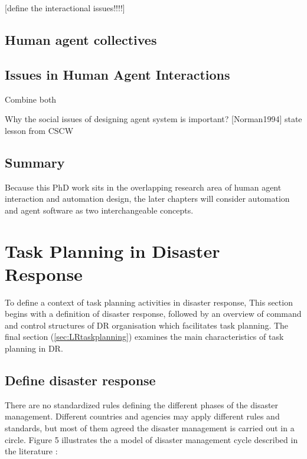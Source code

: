 [define the interactional issues!!!!]

\subsection{Human agent collectives}


\subsection{Issues in Human Agent Interactions }
Combine both 

Why the social issues of designing agent system is important? [Norman1994]
state lesson from CSCW



\subsection{Summary}

Because this PhD work sits in the overlapping research area of human agent interaction and automation design, the later chapters will consider automation and agent software as two interchangeable concepts.

\section{Task Planning in Disaster Response}\label{sec:lrplanning}
To define a context of task planning activities in disaster response, This section begins with a definition of disaster response, followed by an overview of command and control structures of DR organisation which facilitates task planning. The final section (\ref{sec:LRtaskplanning}) examines the main characteristics of task planning in DR.


\subsection{Define disaster response}
There are no standardized rules defining the different phases of the disaster management. Different countries and agencies may apply different rules and standards, but most of them agreed the disaster management is carried out in a circle. Figure 5 illustrates the a model of disaster management cycle described in the literature \cite{Wattegama2012} :\\


